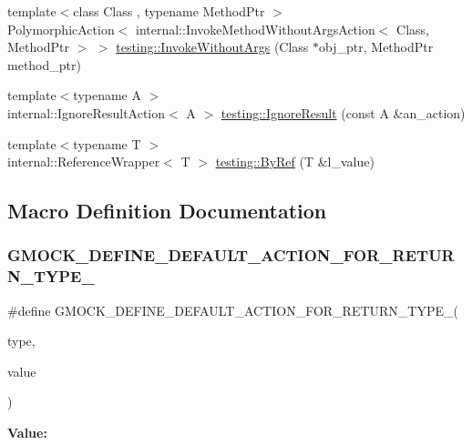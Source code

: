 \begin{DoxyCompactItemize}
\item 
{\footnotesize template$<$class Class , typename Method\+Ptr $>$ }\\Polymorphic\+Action$<$ internal\+::\+Invoke\+Method\+Without\+Args\+Action$<$ Class, Method\+Ptr $>$ $>$ \mbox{\hyperlink{namespacetesting_ab75325d71a8c37db94f349243815c728}{testing\+::\+Invoke\+Without\+Args}} (Class $\ast$obj\+\_\+ptr, Method\+Ptr method\+\_\+ptr)
\item 
{\footnotesize template$<$typename A $>$ }\\internal\+::\+Ignore\+Result\+Action$<$ A $>$ \mbox{\hyperlink{namespacetesting_a50ae42540a31047c7fddd32df8d835f5}{testing\+::\+Ignore\+Result}} (const A \&an\+\_\+action)
\item 
{\footnotesize template$<$typename T $>$ }\\internal\+::\+Reference\+Wrapper$<$ T $>$ \mbox{\hyperlink{namespacetesting_aaee6d42dcd69de6e7a1459c5c71222c3}{testing\+::\+By\+Ref}} (T \&l\+\_\+value)
\end{DoxyCompactItemize}


\subsection{Macro Definition Documentation}
\mbox{\label{gmock-actions_8h_a06b1e6cd1145acf7849e4a112976016b}} 
\subsubsection{\texorpdfstring{GMOCK\_DEFINE\_DEFAULT\_ACTION\_FOR\_RETURN\_TYPE\_}{GMOCK\_DEFINE\_DEFAULT\_ACTION\_FOR\_RETURN\_TYPE\_}}
{\footnotesize\ttfamily \#define G\+M\+O\+C\+K\+\_\+\+D\+E\+F\+I\+N\+E\+\_\+\+D\+E\+F\+A\+U\+L\+T\+\_\+\+A\+C\+T\+I\+O\+N\+\_\+\+F\+O\+R\+\_\+\+R\+E\+T\+U\+R\+N\+\_\+\+T\+Y\+P\+E\+\_\+(\begin{DoxyParamCaption}\item[{}]{type,  }\item[{}]{value }\end{DoxyParamCaption})}

{\bfseries Value\+:}
\begin{DoxyCode}{0}
\DoxyCodeLine{\textcolor{keyword}{template} <> \(\backslash\)}
\DoxyCodeLine{  \}}

\end{DoxyCode}
